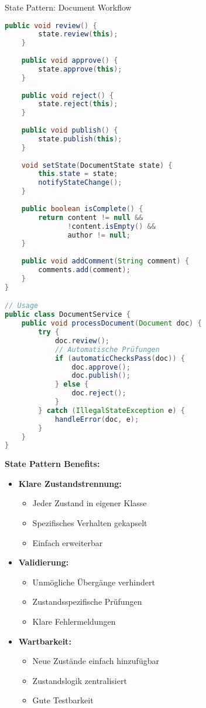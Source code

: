 \begin{example2}{State Pattern: Document Workflow}
\begin{lstlisting}[language=Java, style=basesmol]
    public void review() {
        state.review(this);
    }
    
    public void approve() {
        state.approve(this);
    }
    
    public void reject() {
        state.reject(this);
    }
    
    public void publish() {
        state.publish(this);
    }
    
    void setState(DocumentState state) {
        this.state = state;
        notifyStateChange();
    }
    
    public boolean isComplete() {
        return content != null && 
               !content.isEmpty() && 
               author != null;
    }
    
    public void addComment(String comment) {
        comments.add(comment);
    }
}

// Usage
public class DocumentService {
    public void processDocument(Document doc) {
        try {
            doc.review();
            // Automatische Prüfungen
            if (automaticChecksPass(doc)) {
                doc.approve();
                doc.publish();
            } else {
                doc.reject();
            }
        } catch (IllegalStateException e) {
            handleError(doc, e);
        }
    }
}
\end{lstlisting}

\textbf{State Pattern Benefits:}
\begin{itemize}
    \item \textbf{Klare Zustandstrennung:}
    \begin{itemize}
        \item Jeder Zustand in eigener Klasse
        \item Spezifisches Verhalten gekapselt
        \item Einfach erweiterbar
    \end{itemize}
    
    \item \textbf{Validierung:}
    \begin{itemize}
        \item Unmögliche Übergänge verhindert
        \item Zustandsspezifische Prüfungen
        \item Klare Fehlermeldungen
    \end{itemize}
    
    \item \textbf{Wartbarkeit:}
    \begin{itemize}
        \item Neue Zustände einfach hinzufügbar
        \item Zustandslogik zentralisiert
        \item Gute Testbarkeit
    \end{itemize}
\end{itemize}
\end{example2}

